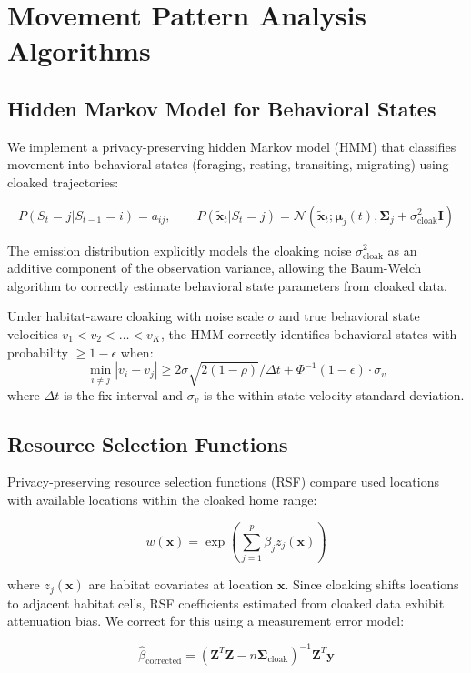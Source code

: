 \section{Movement Pattern Analysis Algorithms}


\subsection{Hidden Markov Model for Behavioral States}

We implement a privacy-preserving hidden Markov model (HMM) that classifies movement into behavioral states (foraging, resting, transiting, migrating) using cloaked trajectories:

\begin{equation}
P(S_t = j | S_{t-1} = i) = a_{ij}, \qquad P(\tilde{\mathbf{x}}_t | S_t = j) = \mathcal{N}(\tilde{\mathbf{x}}_t; \boldsymbol{\mu}_j(t), \boldsymbol{\Sigma}_j + \sigma_{\text{cloak}}^2 \mathbf{I})
\end{equation}

The emission distribution explicitly models the cloaking noise $\sigma_{\text{cloak}}^2$ as an additive component of the observation variance, allowing the Baum-Welch algorithm to correctly estimate behavioral state parameters from cloaked data.

\begin{proposition}
Under habitat-aware cloaking with noise scale $\sigma$ and true behavioral state velocities $v_1 < v_2 < \ldots < v_K$, the HMM correctly identifies behavioral states with probability $\geq 1 - \epsilon$ when:
\begin{equation}
\min_{i \neq j} |v_i - v_j| \geq 2\sigma\sqrt{2(1-\rho)} / \Delta t + \Phi^{-1}(1-\epsilon) \cdot \sigma_v
\end{equation}
where $\Delta t$ is the fix interval and $\sigma_v$ is the within-state velocity standard deviation.
\end{proposition}

\subsection{Resource Selection Functions}

Privacy-preserving resource selection functions (RSF) compare used locations with available locations within the cloaked home range:

\begin{equation}
w(\mathbf{x}) = \exp\left(\sum_{j=1}^{p} \beta_j z_j(\mathbf{x})\right)
\end{equation}

where $z_j(\mathbf{x})$ are habitat covariates at location $\mathbf{x}$. Since cloaking shifts locations to adjacent habitat cells, RSF coefficients estimated from cloaked data exhibit attenuation bias. We correct for this using a measurement error model:

\begin{equation}
\hat{\beta}_{\text{corrected}} = (\mathbf{Z}^T \mathbf{Z} - n\boldsymbol{\Sigma}_{\text{cloak}})^{-1} \mathbf{Z}^T \mathbf{y}
\end{equation}

